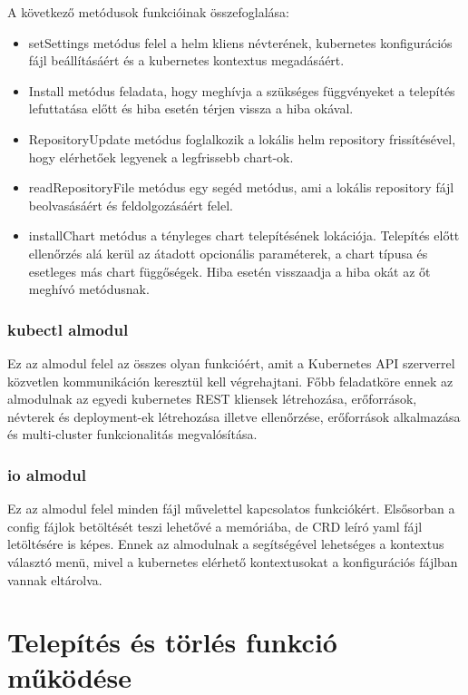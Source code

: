 \newpage

A következő metódusok funkcióinak összefoglalása:
\begin{itemize}
    \item setSettings metódus felel a helm kliens névterének, kubernetes konfigurációs fájl beállításáért és a kubernetes kontextus megadásáért.
    \item Install metódus feladata, hogy meghívja a szükséges függvényeket a telepítés lefuttatása előtt és hiba esetén térjen vissza a hiba okával.
    \item RepositoryUpdate metódus foglalkozik a lokális helm repository frissítésével, hogy elérhetőek legyenek a legfrissebb chart-ok.
    \item readRepositoryFile metódus egy segéd metódus, ami a lokális repository fájl beolvasásáért és feldolgozásáért felel.
    \item installChart metódus a tényleges chart telepítésének lokációja. Telepítés előtt ellenőrzés alá kerül az átadott opcionális paraméterek, a chart típusa és esetleges más chart függőségek. Hiba esetén visszaadja a hiba okát az őt meghívó metódusnak.
\end{itemize}

\subsubsection*{kubectl almodul}
Ez az almodul felel az összes olyan funkcióért, amit a Kubernetes API szerverrel közvetlen kommunikáción keresztül kell végrehajtani.
Főbb feladatköre ennek az almodulnak az egyedi kubernetes REST kliensek létrehozása, erőforrások, névterek és deployment-ek létrehozása illetve ellenőrzése, erőforrások alkalmazása és multi-cluster funkcionalitás megvalósítása.

\subsubsection*{io almodul}
Ez az almodul felel minden fájl művelettel kapcsolatos funkciókért.
Elsősorban a config fájlok betöltését teszi lehetővé a memóriába, de CRD leíró yaml fájl letöltésére is képes.
Ennek az almodulnak a segítségével lehetséges a kontextus választó menü, mivel a kubernetes elérhető kontextusokat a konfigurációs fájlban vannak eltárolva.

\section{Telepítés és törlés funkció működése}

